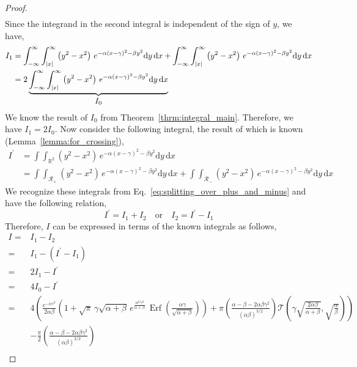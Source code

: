 \documentclass[journal]{IEEEtran}
\theoremstyle{plain}
\theoremstyle{definition}
\theoremstyle{remark}
\newcommand{\R}{\mathbb{R}}
\newcommand{\Ot}{\mathcal{T}}
\newcommand{\Erf}{\operatorname{Erf}}
\newcommand{\dd}{\mathrm{d}}
\begin{document}
\begin{proof}
\begin{equation}
\begin{split}
\end{split}
\end{equation}
Since the integrand in the second integral is independent of the sign of $y$, we have,
\begin{equation}
\begin{split}
    I_1 &= \int_{-\infty}^\infty \int_{|x|}^\infty \left(y^2-x^2\right) \, e^{-\alpha(x-\gamma)^2-\beta y^2} \dd y \, \dd x + \int_{-\infty}^\infty \int_{|x|}^\infty \left(y^2-x^2\right) \, e^{-\alpha(x-\gamma)^2-\beta y^2} \dd y \, \dd x \\
    &= 2 \underbrace{\int_{-\infty}^\infty \int_{|x|}^\infty \left(y^2-x^2\right) \, e^{-\alpha(x-\gamma)^2-\beta y^2} \dd y \, \dd x}_{\text{\normalsize \(I_0\)}}
\end{split}
\end{equation}
We know the result of $I_0$ from Theorem~\ref{thrm:integral_main}. Therefore, we have $I_1 = 2I_0$. Now consider the following integral, the result of which is known (Lemma~\ref{lemma:for_crossing}),
\begin{equation}
\begin{split}
    I^\prime &= \int \int_{\R^2} \left(y^2-x^2\right) \, e^{-\alpha(x-\gamma)^2-\beta y^2} \dd y \, \dd x  \\
    &= \int \int_{\mathcal{R}_+} \left(y^2-x^2\right) \, e^{-\alpha(x-\gamma)^2-\beta y^2} \dd y \, \dd x + \int \int_{\mathcal{R}_-} \left(y^2-x^2\right) \, e^{-\alpha(x-\gamma)^2-\beta y^2} \dd y \, \dd x
\end{split}
\end{equation}
We recognize these integrals from Eq.~\eqref{eq:splitting_over_plus_and_minus} and have the following relation,
\begin{equation}
    I^\prime = I_1 + I_2 \quad \text{or} \quad I_2 = I^\prime - I_1
\end{equation}
Therefore, $I$ can be expressed in terms of the known integrals as follows,
\begin{equation}
\begin{split}
    I =& I_1 - I_2 \\
    =& I_1 - \left(I^\prime - I_1\right) \\
    =& 2I_1 - I^\prime \\
    =& 4I_0 - I^\prime \\
    =& 4\left(\frac{e^{-\alpha \gamma^2}}{2\alpha\beta} \left(1 + \sqrt{\pi} \, \gamma \sqrt{\alpha + \beta}  \, e^{\frac{\alpha^2 \gamma^2}{\alpha + \beta}}  \, \Erf\left(\frac{\alpha \gamma}{\sqrt{\alpha + \beta}}\right)\right) + \pi \left(\frac{\alpha - \beta - 2\alpha\beta\gamma^2}{(\alpha\beta)^{3/2}}\right) \Ot\left(\gamma\sqrt{\frac{2\alpha\beta}{\alpha+\beta}}, \sqrt{\frac{\alpha}{\beta}}\right)\right) \\&- \frac{\pi}{2} \left(\frac{\alpha - \beta - 2\alpha \beta \gamma^2}{\left(\alpha\beta\right)^{3/2}}\right) \\

\end{split}
\end{equation}
\end{proof}
\end{document}
